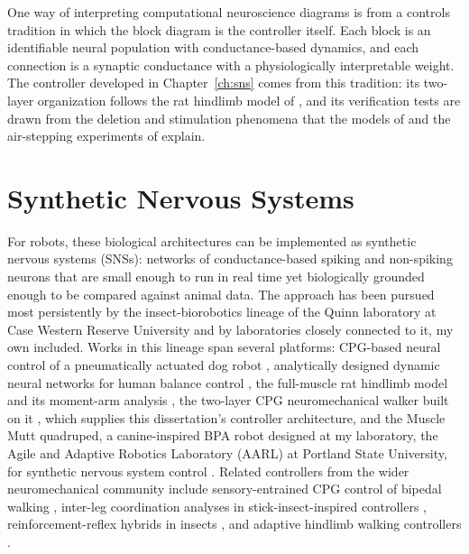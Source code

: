 One way of interpreting computational neuroscience diagrams is from a controls tradition in which the block diagram is the controller itself. Each block is an identifiable neural population with conductance-based dynamics, and each connection is a synaptic conductance with a physiologically interpretable weight. The controller developed in Chapter~\ref{ch:sns} comes from this tradition: its two-layer organization follows the rat hindlimb model of \citet{deng_neuromechanical_2019}, and its verification tests are drawn from the deletion and stimulation phenomena that the models of \citet{rybak_modelling_2006} and the air-stepping experiments of \citet{selionov_tonic_2009} explain.

\section{Synthetic Nervous Systems}\label{sec:bg_sns}

For robots, these biological architectures can be implemented as synthetic nervous systems (SNSs): networks of conductance-based spiking and non-spiking neurons that are small enough to run in real time yet biologically grounded enough to be compared against animal data. The approach has been pursued most persistently by the insect-biorobotics lineage of the Quinn laboratory at Case Western Reserve University and by laboratories closely connected to it, my own included. Works in this lineage span several platforms: CPG-based neural control of a pneumatically actuated dog robot \citep{hunt_development_2017}, analytically designed dynamic neural networks for human balance control \citep{hilts_dynamic_2019}, the full-muscle rat hindlimb model and its moment-arm analysis \citep{young_analyzing_2019}, the two-layer CPG neuromechanical walker built on it \citep{deng_neuromechanical_2019}, which supplies this dissertation's controller architecture, and the Muscle Mutt quadruped, a canine-inspired BPA robot designed at my laboratory, the Agile and Adaptive Robotics Laboratory (AARL) at Portland State University, for synthetic nervous system control \citep{scharzenberger_design_2019}. Related controllers from the wider neuromechanical community include sensory-entrained CPG control of bipedal walking \citep{li_bipedal_2017}, inter-leg coordination analyses in stick-insect-inspired controllers \citep{nourse_analyzing_2019}, reinforcement-reflex hybrids in insects \citep{goldsmith_investigating_2021}, and adaptive hindlimb walking controllers \citep{schilling_adaptive_2022}.

